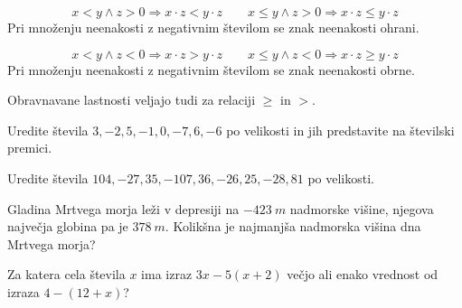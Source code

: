     
        $$x<y \land z>0 \Rightarrow x\cdot z<y\cdot z \quad \quad x\leq y \land z>0 \Rightarrow x\cdot z\leq y\cdot z$$
        Pri množenju neenakosti z negativnim številom se znak neenakosti ohrani.
        \newline

    
        $$x<y \land z<0 \Rightarrow x\cdot z>y\cdot z \quad \quad x\leq y \land z<0 \Rightarrow x\cdot z\geq y\cdot z$$
        Pri množenju neenakosti z negativnim številom se znak neenakosti obrne.
        \newline ~
        \newline

    
        Obravnavane lastnosti veljajo tudi za relaciji $\geq$ in $>$.
        \newline ~
        \newline ~
        \newline





        \begin{naloga}
            Uredite števila $3, -2, 5, -1, 0, -7, 6, -6$ po velikosti in jih predstavite na številski premici.
        \end{naloga}

        \begin{naloga}
            Uredite števila $104, -27, 35, -107, 36, -26, 25, -28, 81$ po velikosti.
        \end{naloga}

        \begin{naloga}
            Gladina Mrtvega morja leži v depresiji na $-423~m$ nadmorske višine, njegova največja globina pa je $378~m$.
            Kolikšna je najmanjša nadmorska višina dna Mrtvega morja?
        \end{naloga}

        \begin{naloga}
            Za katera cela števila $x$ ima izraz $3x-5(x+2)$ večjo ali enako vrednost od izraza $4-(12+x)$?
        \end{naloga}



